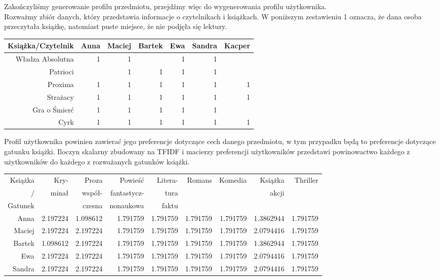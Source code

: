 \documentclass[12pt,a4paper]{report}
\begin{document}
\normalsize{
Zakończyliśmy generowanie profilu przedmiotu, przejdźmy więc do wygenerowania profilu użytkownika. 
\\Rozważmy zbiór danych, który przedstawia informacje o czytelnikach i książkach. W poniższym zestawieniu 1 oznacza, że dana osoba przeczytała książkę, natomiast puste miejsce, że nie podjęła się lektury.
\begin{center}
\begin{tabular}{|r|r|r|r|r|r|r|} \hline
Książka/Czytelnik & Anna & Maciej & Bartek & Ewa & Sandra & Kacper \\
\hline \hline 
Władza Absolutna & 1 & 1 & & 1 & 1 &  \\
Patrioci &  & 1 & 1 & 1 & 1 &  \\
Proxima & 1 & 1 & 1 & 1 & 1 & 1 \\
Strażacy & 1 & 1 & 1 & 1 & 1 & 1 \\
Gra o Śmierć & 1 & 1 & 1 & 1 & 1 &  \\
Cyrk & 1 & 1 & 1 & 1 & 1 & 1 \\
\hline
\end{tabular}
\end{center}
Profil użytkownika powinien zawierać jego preferencje dotyczące cech danego przedmiotu, w tym przypadku będą to preferencje dotyczące gatunku książki. Iloczyn skalarny zbudowany na TFIDF i macierzy preferencji użytkowników przedstawi powinowactwo każdego z użytkowników do każdego z rozważanych gatunków książki. 
\begin{center}
\footnotesize{
\begin{tabular}{|r|r|r|r|r|r|r|r|r|} \hline
Książka  & Kry- & Proza &  Powieść & Litera- & Romans & Komedia & Książka & Thriller\\
/ & minał & współ- &  fantastycz- & tura &  &  & akcji & \\
Gatunek & & czesna &  nonaukowa & faktu &  &  &  & \\
\hline 
Anna &    2.197224 &  1.098612 &  1.791759 &  1.791759 &  1.791759 & 1.791759 & 1.3862944 & 1.791759 \\
\hline
Maciej &  2.197224 &  2.197224 &  1.791759 &  1.791759 &  1.791759 & 1.791759 & 2.0794416 & 1.791759 \\
\hline
Bartek &  1.098612 &  2.197224 &  1.791759 &  1.791759 & 1.791759  & 1.791759  & 1.3862944 & 1.791759 \\
\hline
Ewa &     2.197224 &  2.197224 &  1.791759 &  1.791759 &  1.791759 & 1.791759 & 2.0794416 & 1.791759 \\
\hline
Sandra &  2.197224 &  2.197224 &  1.791759 &  1.791759 &  1.791759 & 1.791759 & 2.0794416 & 1.791759 \\

\end{tabular}}
\end{center}}
\end{document}
